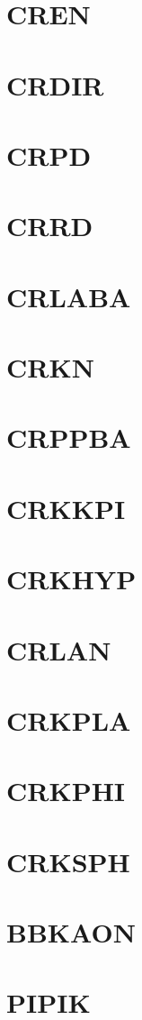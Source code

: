 \documentclass[10pt,UTF8]{ctexbook}
\begin{document}
\section{CREN}
\section{CRDIR}
\section{CRPD}
\section{CRRD}
\section{CRLABA}
\section{CRKN}
\section{CRPPBA}
\section{CRKKPI}
\section{CRKHYP}
\section{CRLAN}
\section{CRKPLA}
\section{CRKPHI}
\section{CRKSPH}
\section{BBKAON}
\section{PIPIK}
\end{document}
